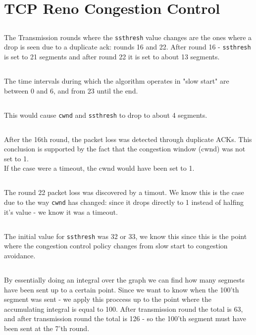 \documentclass{article}
\begin{document}
\section{TCP Reno Congestion Control}
\subsection{}
The Transmission rounds where the \texttt{ssthresh} value
changes are the ones where a drop is seen due to a duplicate ack:
rounds 16 and 22. After round 16 - \texttt{ssthresh} is set to 21 segments
and after round 22 it is set to about 13 segments.

\subsection{}
The time intervals during which the algorithm operates in "slow start"
are between 0 and 6, and from 23 until the end.

\subsection{}
This would cause \texttt{cwnd} and \texttt{ssthresh}
to drop to about 4 segments.

\subsection{}
After the 16th round, the packet loss was detected through duplicate ACKs.
This conclusion is supported by the fact that the congestion window (cwnd) was not set to 1.\\
If the case were a timeout, the cwnd would have been set to 1.


\subsection{}
The round 22 packet loss was discovered by a timout. We know this is
the case due to the way \texttt{cwnd} has changed: since it drops
directly to 1 instead of halfing it's value - we know it was a timeout.

\subsection{}
The initial value for \texttt{ssthresh} was 32 or 33,
we know this since this is the point where the congestion control
policy changes from slow start to congestion avoidance.

\subsection{}
By essentially doing an integral over the graph we can find
how many segmests have been sent up to a certain point. Since we want to
know when the 100'th segment was sent - we apply this proccess up to the point
where the accumulating integral is equal to 100.
After transmission round the total is 63,
and after transmission round the total is 126
- so the 100'th segment must have been sent at the 7'th round.
\end{document}
